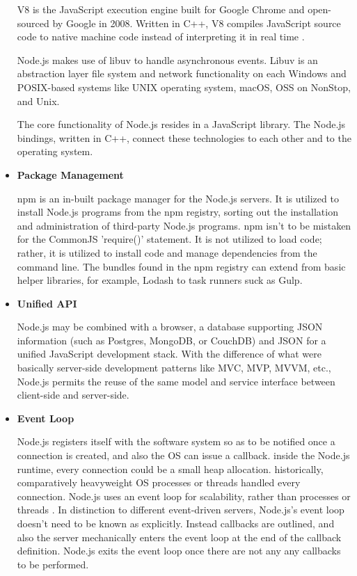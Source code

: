 \documentclass[../thesis.tex]{subfiles}
\begin{document}
\begin{itemize}
    V8 is the JavaScript execution engine built for Google Chrome and open-sourced by Google in 2008. Written in C++, V8 compiles JavaScript source code to native machine code instead of interpreting it in real time \cite{14}.
    \newline
    
    Node.js makes use of libuv to handle asynchronous events. Libuv is an abstraction layer file system and network functionality on each Windows and POSIX-based systems like UNIX operating system, macOS, OSS on NonStop, and Unix.
    \newline
    
    The core functionality of Node.js resides in a JavaScript library. The Node.js bindings, written in C++, connect these technologies to each other and to the operating system.
    \newline
    
    \item \textbf{Package Management}
    \newline
    
    npm is an in-built package manager for the Node.js servers. It is utilized to install Node.js programs from the npm registry, sorting out the installation and administration of third-party Node.js programs. npm isn't to be mistaken for the CommonJS 'require()' statement. It is not utilized to load code; rather, it is utilized to install code and manage dependencies from the command line. The bundles found in the npm registry can extend from basic helper libraries, for example, Lodash to task runners suck as Gulp.
    \newline
    
    \item \textbf{Unified API}
    \newline
    
    Node.js may be combined with a browser, a database supporting JSON information (such as Postgres, MongoDB, or CouchDB) and JSON for a unified JavaScript development stack. With the difference of what were basically server-side development patterns like MVC, MVP, MVVM, etc., Node.js permits the reuse of the same model and service interface between client-side and server-side.
    \newline
    
    \item \textbf{Event Loop}
    \newline
    
    Node.js registers itself with the software system so as to be notified once a connection is created, and also the OS can issue a callback. inside the Node.js runtime, every connection could be a small heap allocation. historically, comparatively heavyweight OS processes or threads handled every connection. Node.js uses an event loop for scalability, rather than processes or threads \cite{node}. In distinction to different event-driven servers, Node.js's event loop doesn't need to be known as explicitly. Instead callbacks are outlined, and also the server mechanically enters the event loop at the end of the callback definition. Node.js exits the event loop once there are not any any callbacks to be performed.
    \newline
    

\end{itemize}
\end{document}
